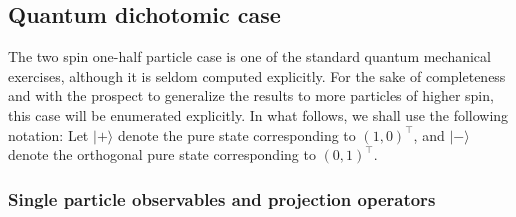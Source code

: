

\subsection{Quantum dichotomic case}

The two spin one-half particle case is one of the standard quantum mechanical exercises, although
it is seldom computed explicitly.
For the sake of completeness and with the prospect to generalize the results to more particles of higher spin,
this case will be enumerated explicitly.
In what follows, we shall use the following notation:
Let
$
\vert +\rangle
$
denote the pure state corresponding to
$\left(1,0\right)^\intercal
$,
and
$
\vert -\rangle $ denote the orthogonal pure state
corresponding to
$\left(0,1\right)^\intercal
$.



\subsubsection{Single particle observables and projection operators}

